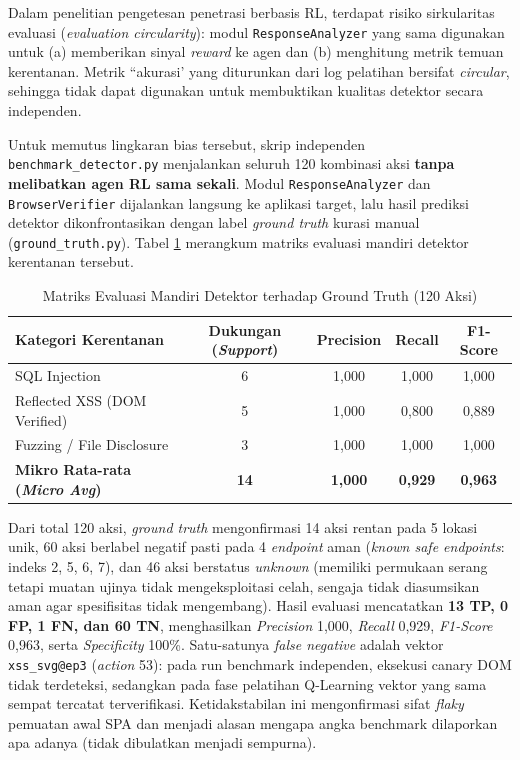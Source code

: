 \begin{enumerate}
Dalam penelitian pengetesan penetrasi berbasis RL, terdapat risiko sirkularitas evaluasi (\textit{evaluation circularity}): modul \texttt{ResponseAnalyzer} yang sama digunakan untuk (a) memberikan sinyal \textit{reward} ke agen dan (b) menghitung metrik temuan kerentanan. Metrik ``akurasi' yang diturunkan dari log pelatihan bersifat \textit{circular}, sehingga tidak dapat digunakan untuk membuktikan kualitas detektor secara independen.

Untuk memutus lingkaran bias tersebut, skrip independen \texttt{benchmark\_detector.py} menjalankan seluruh 120 kombinasi aksi \textbf{tanpa melibatkan agen RL sama sekali}. Modul \texttt{ResponseAnalyzer} dan \texttt{BrowserVerifier} dijalankan langsung ke aplikasi target, lalu hasil prediksi detektor dikonfrontasikan dengan label \textit{ground truth} kurasi manual (\texttt{ground\_truth.py}). Tabel \ref{tab:detector_benchmark} merangkum matriks evaluasi mandiri detektor kerentanan tersebut.

\begin{table}[H]
\centering
\caption{Matriks Evaluasi Mandiri Detektor terhadap Ground Truth (120 Aksi)}
\label{tab:detector_benchmark}
\begin{tabular}{|l|c|c|c|c|}
\hline
\textbf{Kategori Kerentanan} & \textbf{Dukungan (\textit{Support})} & \textbf{Precision} & \textbf{Recall} & \textbf{F1-Score} \\
\hline
SQL Injection & 6 & 1,000 & 1,000 & 1,000 \\
Reflected XSS (DOM Verified) & 5 & 1,000 & 0,800 & 0,889 \\ 
Fuzzing / File Disclosure & 3 & 1,000 & 1,000 & 1,000 \\
\hline
\textbf{Mikro Rata-rata (\textit{Micro Avg})} & \textbf{14} & \textbf{1,000} & \textbf{0,929} & \textbf{0,963} \\ 
\hline
\end{tabular}
\end{table}

Dari total 120 aksi, \textit{ground truth} mengonfirmasi 14 aksi rentan pada 5 lokasi unik, 60 aksi berlabel negatif pasti pada 4 \textit{endpoint} aman (\textit{known safe endpoints}: indeks 2, 5, 6, 7), dan 46 aksi berstatus \textit{unknown} (memiliki permukaan serang tetapi muatan ujinya tidak mengeksploitasi celah, sengaja tidak diasumsikan aman agar spesifisitas tidak mengembang). Hasil evaluasi mencatatkan \textbf{13 TP, 0 FP, 1 FN, dan 60 TN}, menghasilkan \textit{Precision} 1,000, \textit{Recall} 0,929, \textit{F1-Score} 0,963, serta \textit{Specificity} 100\%. 
Satu-satunya \textit{false negative} adalah vektor \texttt{xss\_svg@ep3} (\textit{action} 53): pada run benchmark independen, eksekusi canary DOM tidak terdeteksi, sedangkan pada fase pelatihan Q-Learning vektor yang sama sempat tercatat terverifikasi. Ketidakstabilan ini mengonfirmasi sifat \textit{flaky} pemuatan awal SPA dan menjadi alasan mengapa angka benchmark dilaporkan apa adanya (tidak dibulatkan menjadi sempurna). 


\end{enumerate}

